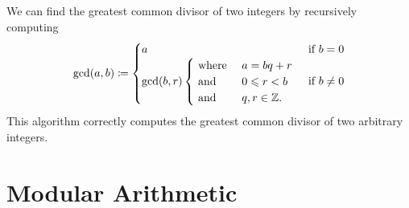 \begin{algorithm}\label{alg:division}
    We can find the greatest common divisor of two integers by recursively computing
    \begin{align*}
        \gcd\pn*{a, b} \defn 
        \begin{cases}
            a
                &\text{ if } b = 0\\
            \gcd\pn*{b, r}
            \begin{cases}
                    \text{ where } &a = bq + r\\
                    \text{ and } &0 \leq r < b\\
                    \text{ and } &q, r \in \Z.
            \end{cases}
                &\text{ if } b \neq 0
        \end{cases}
    \end{align*}
    This algorithm correctly computes the greatest common divisor of two arbitrary integers.
\end{algorithm}

\newpage

\section{Modular Arithmetic}

